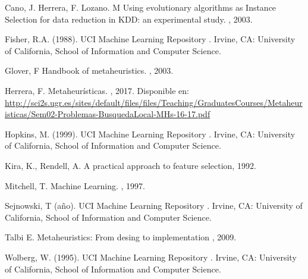 \documentclass{ci5652}
\begin{document}
\begin{thebibliography}{99}

Cano, J. Herrera, F. Lozano. M
\newblock Using evolutionary algorithms as Instance Selection for data
reduction in KDD: an experimental study.
, 2003.

Fisher, R.A. (1988). UCI Machine Learning Repository 
.
\newblock Irvine, CA: University of California, School of Information and Computer Science.

Glover, F
\newblock Handbook of metaheuristics. 
, 2003.

Herrera, F.
\newblock Metaheurísticas. 
, 2017. Disponible en: 
\url{http://sci2s.ugr.es/sites/default/files/files/Teaching/GraduatesCourses/Metaheuristicas/Sem02-Problemas-BusquedaLocal-MHs-16-17.pdf}

Hopkins, M. (1999). UCI Machine Learning Repository 
.
\newblock Irvine, CA: University of California, School of Information and Computer Science.

Kira, K., Rendell, A.
\newblock A practical approach to feature selection, 1992.

Mitchell, T.
\newblock Machine Learning.
, 1997.

Sejnowski, T (año). UCI Machine Learning Repository 
.
\newblock Irvine, CA: University of California, School of Information and Computer Science.

Talbi E.
\newblock Metaheuristics: From desing to implementation
, 2009.

Wolberg, W. (1995). UCI Machine Learning Repository 
.
\newblock Irvine, CA: University of California, School of Information and Computer Science.

%
\end{thebibliography}
\end{document}

